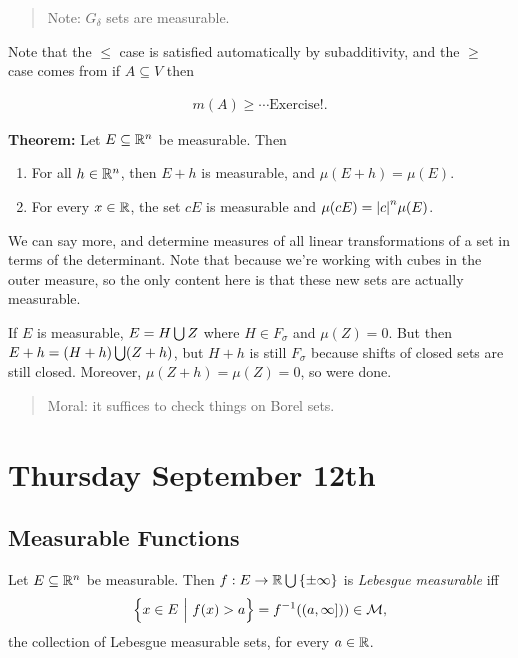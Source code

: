 \begin{quote}
Note: \(G_\delta\) sets are measurable.
\end{quote}

Note that the \(\leq\) case is satisfied automatically by subadditivity,
and the \(\geq\) case comes from if \(A\subseteq V\) then

\begin{align*}
m(A) \geq \cdots \text{Exercise!}
.\end{align*}

\textbf{Theorem:} Let \(E\subseteq {\mathbb{R}}^n\) be measurable. Then

\begin{enumerate}
\def\labelenumi{\arabic{enumi}.}
\item
  For all \(h\in {\mathbb{R}}^n\), then \(E+h\) is measurable, and
  \(\mu(E+h) = \mu(E)\).
\item
  For every \(x\in {\mathbb{R}}\), the set \(cE\) is measurable and
  \(\mu(cE) = {\left\lvert {c} \right\rvert}^n \mu(E)\).
\end{enumerate}

We can say more, and determine measures of all linear transformations of
a set in terms of the determinant. Note that because we're working with
cubes in the outer measure, so the only content here is that these new
sets are actually measurable.

If \(E\) is measurable, \(E = H \bigcup Z\) where \(H \in F_\sigma\) and
\(\mu(Z) = 0\). But then \(E+h = (H+h) \bigcup (Z + h)\), but \(H+h\) is
still \(F_\sigma\) because shifts of closed sets are still closed.
Moreover, \(\mu(Z+h) = \mu(Z) = 0\), so were done.

\begin{quote}
Moral: it suffices to check things on Borel sets.
\end{quote}

\hypertarget{thursday-september-12th}{%
\section{Thursday September 12th}\label{thursday-september-12th}}

\hypertarget{measurable-functions}{%
\subsection{Measurable Functions}\label{measurable-functions}}

Let \(E\subseteq {\mathbb{R}}^n\) be measurable. Then
\(f: E \to {\mathbb{R}} \bigcup \left\{{\pm \infty}\right\}\) is \emph{Lebesgue
measurable} iff
\begin{align*}
\left\{{x \in E {~\mathrel{\Big|}~} f(x) > a}\right\} = f^{-1}((a, \infty])) \in \mathcal M
,\end{align*} the collection of Lebesgue measurable sets, for every
\(a\in{\mathbb{R}}\).

